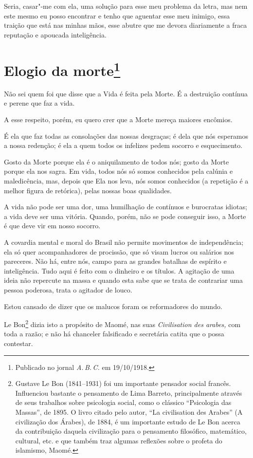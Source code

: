 Seria, casar"-me com ela, uma solução para esse meu problema da letra,
mas nem este mesmo eu posso encontrar e tenho que aguentar esse meu
inimigo, essa traição que está nas minhas mãos, esse abutre que me
devora diariamente a fraca reputação e apoucada inteligência.

\chapter[Elogio da morte]{Elogio da morte\footnote[*]{Publicado no jornal \emph{A.\,B.\,C.} em 19/10/1918.}}

Não sei quem foi que disse que a Vida é feita pela Morte. É a destruição
contínua e perene que faz a vida.

A esse respeito, porém, eu quero crer que a Morte mereça maiores
encômios.

É ela que faz todas as consolações das nossas desgraças; é dela que nós
esperamos a nossa redenção; é ela a quem todos os infelizes pedem
socorro e esquecimento.

Gosto da Morte porque ela é o aniquilamento de todos nós; gosto da Morte
porque ela nos sagra. Em vida, todos nós só somos conhecidos pela
calúnia e maledicência, mas, depois que Ela nos leva, nós somos
conhecidos (a repetição é a melhor figura de retórica), pelas nossas
boas qualidades.


A vida não pode ser uma dor, uma humilhação de contínuos e burocratas
idiotas; a vida deve ser uma vitória. Quando, porém, não se pode
conseguir isso, a Morte é que deve vir em nosso socorro.

A covardia mental e moral do Brasil não permite movimentos de
independência; ela só quer acompanhadores de procissão, que só visam
lucros ou salários nos pareceres. Não há, entre nós, campo para as
grandes batalhas de espírito e inteligência. Tudo aqui é feito com o
dinheiro e os títulos. A agitação de uma ideia não repercute na massa e
quando esta sabe que se trata de contrariar uma pessoa poderosa, trata o
agitador de louco.

Estou cansado de dizer que os malucos foram os reformadores do mundo.

Le Bon\footnote{Gustave Le Bon (1841--1931) foi um importante pensador
  social francês. Influenciou bastante o pensamento de Lima Barreto,
  principalmente através de seus trabalhos sobre psicologia social, como
  o clássico ``Psicologia das Massas'', de 1895. O livro citado pelo
  autor, ``La civilisation des Arabes'' (A civilização dos Árabes), de
  1884, é um importante estudo de Le Bon acerca da contribuição daquela
  civilização para o pensamento filosófico, matemático, cultural, etc. e
  que também traz algumas reflexões sobre o profeta do islamismo, Maomé.}
dizia isto a propósito de Maomé, nas suas \emph{Civilisation des
arabes,} com toda a razão; e não há chanceler falsificado e secretária
catita que o possa contestar.

